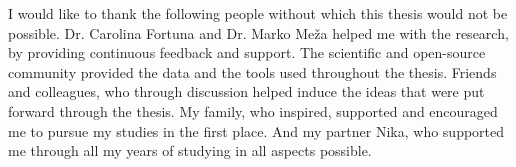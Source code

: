 \documentclass[
11pt, %
english, %
singlespacing, %
headsepline, %
]{MastersDoctoralThesis} %
\begin{document}

\begin{acknowledgements}
\addchaptertocentry{\acknowledgementname} %
I would like to thank the following people without which this thesis would not be possible.
Dr. Carolina Fortuna and Dr. Marko Meža helped me with the research, by providing continuous feedback and support.
The scientific and open-source community provided the data and the tools used throughout the thesis.
Friends and colleagues, who through discussion helped induce the ideas that were put forward through the thesis. 
My family, who inspired, supported and encouraged me to pursue my studies in the first place.
And my partner Nika, who supported me through all my years of studying in all aspects possible.

\end{acknowledgements}


\tableofcontents %

\listoffigures %

\listoftables %

\end{document}
